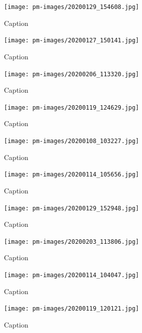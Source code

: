         \clearpage
        
\begin{figure}[]
\centering
\texttt{[image: pm-images/20200129\_154608.jpg]}
\caption{Caption}
\end{figure}

        \clearpage
        
\begin{figure}[]
\centering
\texttt{[image: pm-images/20200127\_150141.jpg]}
\caption{Caption}
\end{figure}

        \clearpage
        
\begin{figure}[]
\centering
\texttt{[image: pm-images/20200206\_113320.jpg]}
\caption{Caption}
\end{figure}

\begin{figure}[]
\centering
\texttt{[image: pm-images/20200119\_124629.jpg]}
\caption{Caption}
\end{figure}

        \clearpage
        
\begin{figure}[]
\centering
\texttt{[image: pm-images/20200108\_103227.jpg]}
\caption{Caption}
\end{figure}

        \clearpage
        
\begin{figure}[]
\centering
\texttt{[image: pm-images/20200114\_105656.jpg]}
\caption{Caption}
\end{figure}

        \clearpage
        
\begin{figure}[]
\centering
\texttt{[image: pm-images/20200129\_152948.jpg]}
\caption{Caption}
\end{figure}

        \clearpage
        
\begin{figure}[]
\centering
\texttt{[image: pm-images/20200203\_113806.jpg]}
\caption{Caption}
\end{figure}

        \clearpage
        
\begin{figure}[]
\centering
\texttt{[image: pm-images/20200114\_104047.jpg]}
\caption{Caption}
\end{figure}

        \clearpage
        
\begin{figure}[]
\centering
\texttt{[image: pm-images/20200119\_120121.jpg]}
\caption{Caption}
\end{figure}

        \clearpage
        